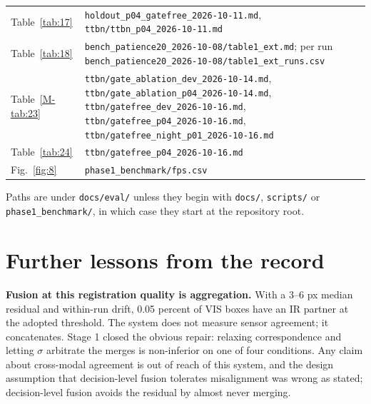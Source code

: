\documentclass[journal,onecolumn]{IEEEtran}
\begin{document}
\begin{table}[htbp]
\begin{tabularx}{\linewidth}{l>{\raggedright\arraybackslash}X}
Table~\ref{tab:17} & \texttt{holdout\_\allowbreak{}p04\_\allowbreak{}gatefree\_\allowbreak{}2026-\allowbreak{}10-\allowbreak{}11.md}, \texttt{ttbn/\allowbreak{}ttbn\_\allowbreak{}p04\_\allowbreak{}2026-\allowbreak{}10-\allowbreak{}11.md} \\
Table~\ref{tab:18} & \texttt{bench\_\allowbreak{}patience20\_\allowbreak{}2026-\allowbreak{}10-\allowbreak{}08/\allowbreak{}table1\_\allowbreak{}ext.md}; per run \texttt{bench\_\allowbreak{}patience20\_\allowbreak{}2026-\allowbreak{}10-\allowbreak{}08/\allowbreak{}table1\_\allowbreak{}ext\_\allowbreak{}runs.csv} \\
Table~\ref{M-tab:23} & \texttt{ttbn/\allowbreak{}gate\_\allowbreak{}ablation\_\allowbreak{}dev\_\allowbreak{}2026-\allowbreak{}10-\allowbreak{}14.md}, \texttt{ttbn/\allowbreak{}gate\_\allowbreak{}ablation\_\allowbreak{}p04\_\allowbreak{}2026-\allowbreak{}10-\allowbreak{}14.md}, \texttt{ttbn/\allowbreak{}gatefree\_\allowbreak{}dev\_\allowbreak{}2026-\allowbreak{}10-\allowbreak{}16.md}, \texttt{ttbn/\allowbreak{}gatefree\_\allowbreak{}p04\_\allowbreak{}2026-\allowbreak{}10-\allowbreak{}16.md}, \texttt{ttbn/\allowbreak{}gatefree\_\allowbreak{}night\_\allowbreak{}p01\_\allowbreak{}2026-\allowbreak{}10-\allowbreak{}16.md} \\
Table~\ref{tab:24} & \texttt{ttbn/\allowbreak{}gatefree\_\allowbreak{}p04\_\allowbreak{}2026-\allowbreak{}10-\allowbreak{}16.md} \\
Fig.~\ref{fig:8} & \texttt{phase1\_\allowbreak{}benchmark/\allowbreak{}fps.csv} \\
\bottomrule
\end{tabularx}
\par\smallskip\raggedright\footnotesize Paths are under \texttt{docs/\allowbreak{}eval/\allowbreak{}} unless they begin with \texttt{docs/\allowbreak{}}, \texttt{scripts/\allowbreak{}} or \texttt{phase1\_\allowbreak{}benchmark/\allowbreak{}}, in which case they start at the repository root.
\end{table}
\FloatBarrier
\section{Further lessons from the record}\label{app:J}
\textbf{Fusion at this registration quality is aggregation.} With a 3--6 px median residual and within-run drift, 0.05 percent of VIS boxes have an IR partner at the adopted threshold. The system does not measure sensor agreement; it concatenates. Stage 1 closed the obvious repair: relaxing correspondence and letting $\sigma$ arbitrate the merges is non-inferior on one of four conditions. Any claim about cross-modal agreement is out of reach of this system, and the design assumption that decision-level fusion tolerates misalignment was wrong as stated; decision-level fusion avoids the residual by almost never merging.
\end{document}
